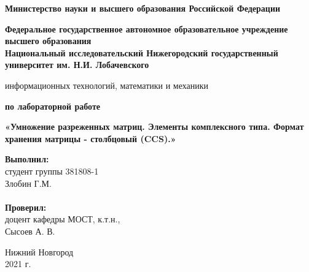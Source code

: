 \documentclass{report}
\begin{document}
\begin{titlepage}
	\begin{center}
		\textbf{Министерство науки и высшего образования Российской Федерации}
	\end{center}

	\begin{center}
		\textbf{Федеральное государственное автономное образовательное учреждение высшего образования \\
		Национальный исследовательский Нижегородский государственный университет им. Н.И. Лобачевского}
	\end{center}

	\begin{center}
	 информационных технологий, математики и механики
	\end{center}

	\vspace{4em}

	\begin{center}
		\textbf{ по лабораторной работе} \\
	\end{center}

	\begin{center}
		\textbf{\LARGE«Умножение разреженных матриц. Элементы комплексного типа. Формат хранения матрицы - столбцовый (CCS).»} \\
	\end{center}

	\vspace{10em}

	\hfill\parbox{6cm}{
		\hspace*{5cm}\hspace*{-5cm}\textbf{Выполнил:} \\ студент группы 381808-1 \\ Злобин Г.М. \\
		\\
		\hspace*{5cm}\hspace*{-5cm}\textbf{Проверил:}\\ доцент кафедры МОСТ, к.т.н., \\ Сысоев А. В.
	}

	\vspace{\fill}

	\begin{center}
		Нижний Новгород \\ 2021 г.
	\end{center}

\end{titlepage}
\end{document}

